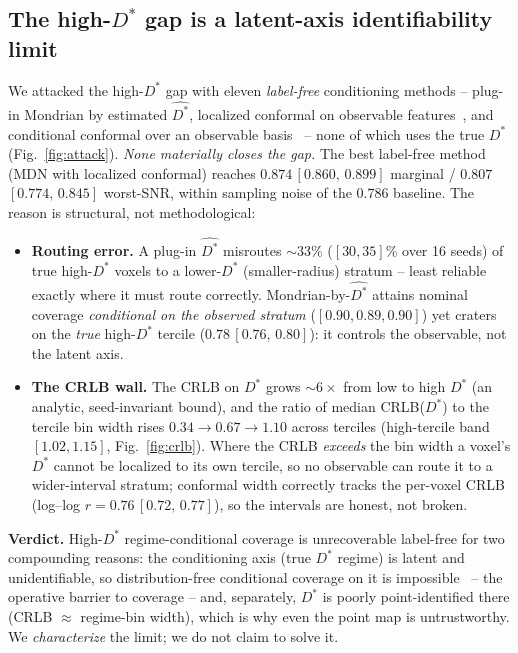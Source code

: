 \documentclass[11pt]{article}
\newcommand{\Dstar}{D^{*}}
\newcommand{\band}[2]{{\scriptsize\,$[#1,\,#2]$}}
\begin{document}
\subsection{The high-$\Dstar$ gap is a latent-axis identifiability limit}
\label{sec:identifiability}
We attacked the high-$\Dstar$ gap with eleven \emph{label-free} conditioning
methods -- plug-in Mondrian by estimated $\hat{\Dstar}$, localized conformal on
observable features~\citep{guan2023}, and conditional conformal over an observable
basis~\citep{gibbs2023} -- none of which uses the true $\Dstar$
(Fig.~\ref{fig:attack}). \emph{None materially closes the gap.} The best label-free
method (MDN with localized conformal) reaches $0.874$\band{0.860}{0.899} marginal /
$0.807$\band{0.774}{0.845} worst-SNR, within sampling noise of the $0.786$ baseline.
The reason is structural, not
methodological:
\begin{itemize}
\item \textbf{Routing error.} A plug-in $\hat{\Dstar}$ misroutes $\sim33\%$
($[30,35]\%$ over 16 seeds) of true high-$\Dstar$ voxels to a lower-$\Dstar$
(smaller-radius) stratum -- least reliable exactly where it must route correctly.
Mondrian-by-$\hat{\Dstar}$ attains nominal coverage \emph{conditional on the observed
stratum} ($[0.90,0.89,0.90]$) yet craters on the \emph{true} high-$\Dstar$ tercile
($0.78$\band{0.76}{0.80}): it controls the observable, not the latent axis.
\item \textbf{The CRLB wall.} The CRLB on $\Dstar$ grows $\sim6\times$ from low to high
$\Dstar$ (an analytic, seed-invariant bound), and the ratio of median CRLB($\Dstar$)
to the tercile bin width rises $0.34\to0.67\to1.10$ across terciles (high-tercile band
$[1.02,1.15]$, Fig.~\ref{fig:crlb}). Where the CRLB \emph{exceeds} the bin width a
voxel's $\Dstar$ cannot be localized to its own tercile, so no observable can route it
to a wider-interval stratum; conformal width correctly tracks the per-voxel CRLB
(log--log $r=0.76$\band{0.72}{0.77}), so the intervals are honest, not broken.
\end{itemize}
\textbf{Verdict.} High-$\Dstar$ regime-conditional coverage is unrecoverable
label-free for two compounding reasons: the conditioning axis (true $\Dstar$ regime)
is latent and unidentifiable, so distribution-free conditional coverage on it is
impossible~\citep{barber2021limits} -- the operative barrier to coverage -- and,
separately, $\Dstar$ is poorly point-identified there (CRLB $\approx$ regime-bin
width), which is why even the point map is untrustworthy. We \emph{characterize} the
limit; we do not claim to solve it.
\end{document}
